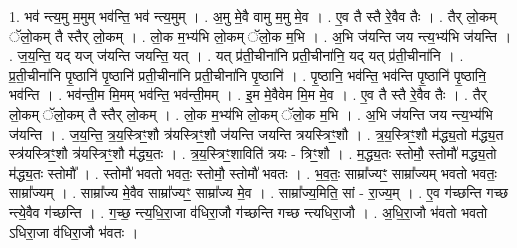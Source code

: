 \documentclass[17pt]{extarticle}
\begin{document}
1. भव॑ न्त्य॒मु म॒मुम् भव॑न्ति॒ भव॑ न्त्य॒मुम् । . अ॒मु मे॒वै वामु म॒मु मे॒व । . ए॒व तै स्तै रे॒वैव तैः । . तैर् लो॒कम् ॅलो॒कम् तै स्तैर् लो॒कम् । . लो॒क म॒भ्य॑भि लो॒कम् ॅलो॒क म॒भि । . अ॒भि ज॑यन्ति जय न्त्य॒भ्य॑भि ज॑यन्ति । . ज॒य॒न्ति॒ यद् यज् ज॑यन्ति जयन्ति॒ यत् । . यत् प्र॑ती॒चीना॑नि प्रती॒चीना॑नि॒ यद् यत् प्र॑ती॒चीना॑नि । . प्र॒ती॒चीना॑नि पृ॒ष्ठानि॑ पृ॒ष्ठानि॑ प्रती॒चीना॑नि प्रती॒चीना॑नि पृ॒ष्ठानि॑ । . पृ॒ष्ठानि॒ भव॑न्ति॒ भव॑न्ति पृ॒ष्ठानि॑ पृ॒ष्ठानि॒ भव॑न्ति । . भव॑न्ती॒म मि॒मम् भव॑न्ति॒ भव॑न्ती॒मम् । . इ॒म मे॒वैवेम मि॒म मे॒व । . ए॒व तै स्तै रे॒वैव तैः । . तैर् लो॒कम् ॅलो॒कम् तै स्तैर् लो॒कम् । . लो॒क म॒भ्य॑भि लो॒कम् ॅलो॒क म॒भि । . अ॒भि ज॑यन्ति जय न्त्य॒भ्य॑भि ज॑यन्ति । . ज॒य॒न्ति॒ त्र॒य॒स्त्रिꣳ॒॒शौ त्र॑यस्त्रिꣳ॒॒शौ ज॑यन्ति जयन्ति त्रयस्त्रिꣳ॒॒शौ । . त्र॒य॒स्त्रिꣳ॒॒शौ म॑द्ध्य॒तो म॑द्ध्य॒त स्त्र॑यस्त्रिꣳ॒॒शौ त्र॑यस्त्रिꣳ॒॒शौ म॑द्ध्य॒तः । . त्र॒य॒स्त्रिꣳ॒॒शाविति॑ त्रयः - त्रिꣳ॒॒शौ । . म॒द्ध्य॒तः स्तोमौ॒ स्तोमौ॑ मद्ध्य॒तो म॑द्ध्य॒तः स्तोमौ᳚ । . स्तोमौ॑ भवतो भवतः॒ स्तोमौ॒ स्तोमौ॑ भवतः । . भ॒व॒तः॒ साम्रा᳚ज्यꣳ॒॒ साम्रा᳚ज्यम् भवतो भवतः॒ साम्रा᳚ज्यम् । . साम्रा᳚ज्य मे॒वैव साम्रा᳚ज्यꣳ॒॒ साम्रा᳚ज्य मे॒व । . साम्रा᳚ज्य॒मिति॒ सां - रा॒ज्य॒म् । . ए॒व ग॑च्छन्ति गच्छ न्त्ये॒वैव ग॑च्छन्ति । . ग॒च्छ॒ न्त्य॒धि॒रा॒जा व॑धिरा॒जौ ग॑च्छन्ति गच्छ न्त्यधिरा॒जौ । . अ॒धि॒रा॒जौ भ॑वतो भवतो ऽधिरा॒जा व॑धिरा॒जौ भ॑वतः । \newline
\end{document}
